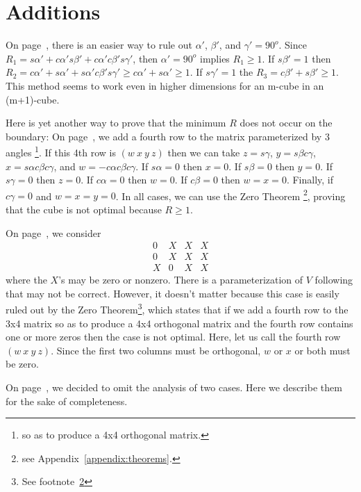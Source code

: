 \section{Additions}
On page~\pageref{refpage3}, there is an easier way
to rule out $\alpha'$, $\beta'$, and $\gamma' = 90^o$.  Since $R_1 = s\alpha'
+ c\alpha' s\beta' + c\alpha' c\beta' s\gamma'$, then $\alpha' = 90^o$ implies
$R_1 \geq 1$.  If $s\beta' = 1$ then $R_2 = c\alpha' + s\alpha' +s\alpha'
c\beta' s\gamma' \geq c\alpha' + s\alpha' \geq 1$.  If $s\gamma' = 1$ the $R_3
= c\beta' + s\beta' \geq 1$.  This method seems to work even in higher
dimensions for an m-cube in an (m+1)-cube.

Here is yet another way to prove that the minimum $R$ does not occur on the
boundary:  On page~\pageref{refpage4}, we add a fourth row to the matrix
parameterized by 3 angles \footnote{so as to produce a 4x4 orthogonal matrix.}.
If this 4th row is $(w~x~y~z)$ then we can take $z = s\gamma$, $y = s\beta
c\gamma$, $x = s\alpha c\beta c\gamma$, and $w = -c\alpha c\beta c\gamma$. If
$s\alpha = 0$ then $x = 0$.  If $s\beta = 0$ then $y = 0$.  If $s\gamma = 0$
then $z = 0$.  If $c\alpha = 0$ then $w = 0$.  If $c\beta = 0$ then $w = x =
0$.  Finally, if $c\gamma = 0$ and $w = x = y = 0$.  In all cases, we can use
the Zero Theorem
\footnote{\label{footnote:zerotheorem}see Appendix~\ref{appendix:theorems}.},
proving that the cube is not optimal because $R \geq 1$.

On page~\pageref{refpage5}, we consider
\begin{equation*}
\begin{array}{cccc}
0 & X & X & X \\
0 & X & X & X \\
X & 0 & X & X
\end{array}
\end{equation*}
where the $X$'s may be zero or nonzero.  There is a parameterization of $V$
following that may not be correct.  However, it doesn't matter because this
case is easily ruled out by the Zero Theorem\footnote{See
footnote~\ref{footnote:zerotheorem}}, which states that if we add a fourth row
to the 3x4 matrix so as to produce a 4x4 orthogonal matrix and the fourth row
contains one or more zeros then the case is not optimal.  Here, let us call
the fourth row $(w~x~y~z)$.  Since the first two columns must be orthogonal,
$w$ or $x$ or both must be zero.

On page~\pageref{refpage6}, we decided to omit the analysis of two cases.
Here we describe them for the sake of completeness.
\newpage

